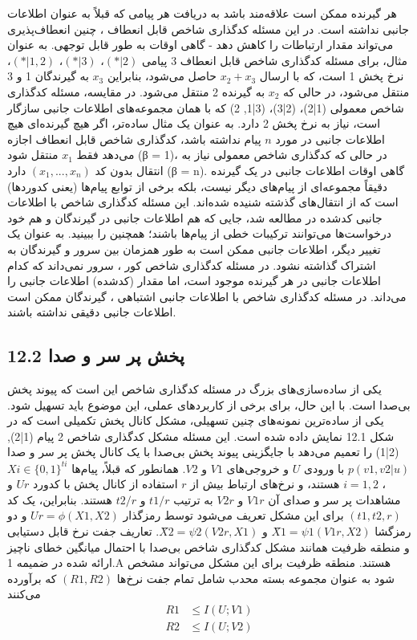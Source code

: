 هر گیرنده ممکن است علاقه‌مند باشد به دریافت هر پیامی که قبلاً به عنوان اطلاعات جانبی نداشته است. در این مسئله کدگذاری شاخص قابل انعطاف \lr{[31, 138]}، چنین انعطاف‌پذیری می‌تواند مقدار ارتباطات را کاهش دهد - گاهی اوقات به طور قابل توجهی. به عنوان مثال، برای مسئله کدگذاری شاخص قابل انعطاف 3 پیامی \((\ast|2)\)، \((\ast|3)\)، \((\ast|1, 2)\)، نرخ پخش 1 است، که با ارسال \(x_2 + x_3\) حاصل می‌شود، بنابراین \(x_3\) به گیرندگان 1 و 3 منتقل می‌شود، در حالی که \(x_2\) به گیرنده 2 منتقل می‌شود. در مقایسه، مسئله کدگذاری شاخص معمولی (1|2)، (2|3)، (3|1, 2) که با همان مجموعه‌های اطلاعات جانبی سازگار است، نیاز به نرخ پخش 2 دارد. به عنوان یک مثال ساده‌تر، اگر هیچ گیرنده‌ای هیچ اطلاعات جانبی در مورد \(n\) پیام نداشته باشد، کدگذاری شاخص قابل انعطاف اجازه می‌دهد فقط \(x_1\) منتقل شود (β = 1)، در حالی که کدگذاری شاخص معمولی نیاز به انتقال بدون کد \((x_1, . . . , x_n)\) دارد (β = n).
گاهی اوقات اطلاعات جانبی در یک گیرنده دقیقاً مجموعه‌ای از پیام‌های دیگر نیست، بلکه برخی از توابع پیام‌ها (یعنی کدوردها) است که از انتقال‌های گذشته شنیده شده‌اند. این مسئله کدگذاری شاخص با اطلاعات جانبی کدشده در \lr{[50]} مطالعه شد، جایی که هم اطلاعات جانبی در گیرندگان و هم خود درخواست‌ها می‌توانند ترکیبات خطی از پیام‌ها باشند؛ همچنین \lr{[92, 32]} را ببینید.
به عنوان یک تغییر دیگر، اطلاعات جانبی ممکن است به طور همزمان بین سرور و گیرندگان به اشتراک گذاشته نشود. در مسئله کدگذاری شاخص کور \lr{[83]}، سرور نمی‌داند که کدام اطلاعات جانبی در هر گیرنده موجود است، اما مقدار (کدشده) اطلاعات جانبی را می‌داند. در مسئله کدگذاری شاخص با اطلاعات جانبی اشتباهی \lr{[85]}، گیرندگان ممکن است اطلاعات جانبی دقیقی نداشته باشند.


\subsection{12.2 پخش پر سر و صدا}

یکی از ساده‌سازی‌های بزرگ در مسئله کدگذاری شاخص این است که پیوند پخش بی‌صدا است. با این حال، برای برخی از کاربردهای عملی، این موضوع باید تسهیل شود. یکی از ساده‌ترین نمونه‌های چنین تسهیلی، مشکل کانال پخش تکمیلی \lr{[155, 157, 89]} است که در شکل 12.1 نمایش داده شده است. این مسئله مشکل کدگذاری شاخص 2 پیام (1|2),(2|1) را تعمیم می‌دهد با جایگزینی پیوند پخش بی‌صدا با یک کانال پخش پر سر و صدا \(p(v1, v2|u)\) با ورودی \(U\) و خروجی‌های \(V1\) و \(V2\). همانطور که قبلاً، پیام‌ها \(Xi \in \{0, 1\}^{ti}\)، \(i = 1, 2\) هستند، و نرخ‌های ارتباط بیش از \(r\) استفاده از کانال پخش با کدورد \(Ur\) و مشاهدات پر سر و صدای آن \(V1r\) و \(V2r\) به ترتیب \(t1/r\) و \(t2/r\) هستند. بنابراین، یک کد \((t1,t2,r)\) برای این مشکل تعریف می‌شود توسط رمزگذار \(Ur = \phi(X1,X2)\) و دو رمزگشا \(X̂1 = \psi1(V1r, X2)\) و \(X̂2 = \psi2(V2r, X1)\). تعاریف جفت نرخ قابل دستیابی و منطقه ظرفیت همانند مشکل کدگذاری شاخص بی‌صدا با احتمال میانگین خطای ناچیز ارائه شده در ضمیمه 1.A هستند. منطقه ظرفیت برای این مشکل می‌تواند مشخص شود به عنوان مجموعه بسته محدب شامل تمام جفت نرخ‌ها \((R1, R2)\) که برآورده می‌کنند
\begin{align*}
	R1 &\leq I(U;V1) \\
	R2 &\leq I(U;V2)
\end{align*}

